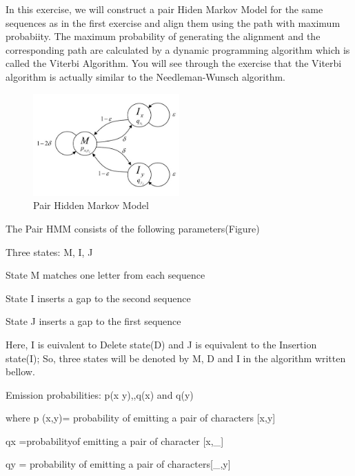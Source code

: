 \documentclass[a4paper,11pt]{article}
\begin{document}
In this exercise, we will construct a pair Hiden Markov Model for
the same sequences as in the first exercise and align them using the
path with maximum probabiity. The maximum probability of generating
the alignment and the corresponding path are calculated by a dynamic
programming algorithm which is called the Viterbi Algorithm. You will
see through the exercise that the Viterbi algorithm is actually similar
to the Needleman-Wunsch algorithm.

%
\begin{figure}[h]
\begin{center}
\includegraphics[width=0.5\textwidth]{HMM.jpg}\caption{Pair Hidden Markov Model}

\end{center}

%
\end{figure}


The Pair HMM consists of the following parameters(Figure)

\vspace{0.5cm}

Three states: M, I, J

State M matches one letter from each sequence

State I inserts a gap to the second sequence

State J inserts a gap to the first sequence 


Here, I is euivalent to Delete state(D) and J is equivalent to the Insertion state(I);
So, three states will be denoted by M, D and I in the algorithm written bellow.
\vspace{0.5cm}

Emission probabilities: p(x y),,q(x) and q(y)

where p (x,y)= probability of emitting a pair of characters {[}x,y{]}

qx =probabilityof emitting a pair of character {[}x,\_{]}

qy = probability of emitting a pair of characters{[}\_,y{]}

\vspace{0.5cm}
\end{document}
